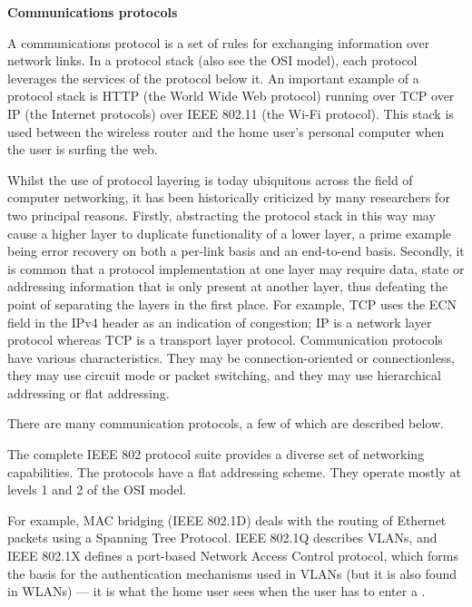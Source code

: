 \documentclass[a4paper]{article}
\begin{document}
\begin{enumerate}[label={\textbf{\Roman*.}},leftmargin=0pt,itemindent=*]
\begin{enumerate}[label=\arabic*.,itemsep=0pt]
    \end{enumerate}

  \newpage


  \vspace{6ex}

    \begin{center}
      \textbf{Communications protocols}
    \end{center}

    A communications protocol is a set of rules for exchanging information over
    network links. In a protocol stack (also see the OSI model), each protocol
    leverages the services of the protocol below it. An important example of a
    protocol stack is HTTP (the World Wide Web protocol) running over TCP over
    IP (the Internet protocols) over IEEE 802.11 (the Wi-Fi protocol). This
    stack is used between the wireless router and the home user's personal
    computer when the user is surfing the web.

    Whilst the use of protocol layering is today ubiquitous across the field of
    computer networking, it has been historically criticized by many researchers
    for two principal reasons. Firstly, abstracting the protocol stack in this
    way may cause a higher layer to duplicate functionality of a lower layer, a
    prime example being error recovery on both a per-link basis and an
    end-to-end basis. Secondly, it is common that a protocol implementation at
    one layer may require data, state or addressing information that is only
    present at another layer, thus defeating the point of separating the layers
    in the first place. For example, TCP uses the ECN field in the IPv4 header
    as an indication of congestion; IP is a network layer protocol whereas TCP
    is a transport layer protocol. Communication protocols have various
    characteristics. They may be connection-oriented or connectionless, they may
    use circuit mode or packet switching, and they may use hierarchical
    addressing or flat addressing.

    There are many communication protocols, a few of which are described below.

    The complete IEEE 802 protocol suite provides a diverse set of networking
    capabilities. The protocols have a flat addressing scheme. They operate
    mostly at levels 1 and 2 of the OSI model.

    For example, MAC bridging (IEEE 802.1D) deals with the routing of Ethernet
    packets using a Spanning Tree Protocol. IEEE 802.1Q describes VLANs, and
    IEEE 802.1X defines a port-based Network Access Control protocol, which
    forms the basis for the authentication mechanisms used in VLANs (but it is
    also found in WLANs) --- it is what the home user sees when the user has to
    enter a .


\end{enumerate}
\end{document}
